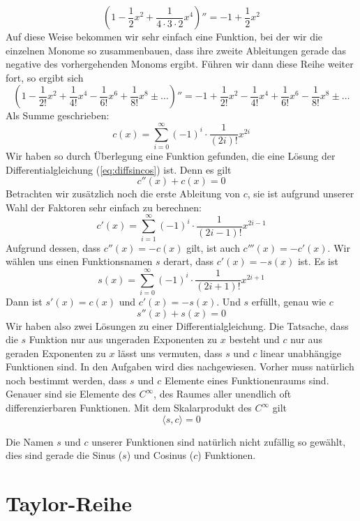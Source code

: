 \begin{equation}
\left(1 - \frac{1}{2}x^2 + \frac{1}{4\cdot 3\cdot 2} x^4 \right)'' = -1 +\frac{1}{2}x^2
\end{equation}
Auf diese Weise bekommen wir sehr einfach eine Funktion, bei der wir die einzelnen Monome so zusammenbauen, dass ihre zweite Ableitungen gerade das negative des vorhergehenden Monoms ergibt. Führen wir dann diese Reihe weiter fort, so ergibt sich
\begin{equation}
\left( 1-\frac{1}{2!}x^2 +\frac{1}{4!}x^4 -\frac{1}{6!}x^6+\frac{1}{8!}x^8 \pm \dots \right)'' =
-1+\frac{1}{2!}x^2 -\frac{1}{4!}x^4 +\frac{1}{6!}x^6 -\frac{1}{8!}x^8 \pm \dots
\end{equation}
Als Summe geschrieben:
\begin{equation}
c(x) = \sum_{i=0}^{\infty} (-1)^{i} \cdot \frac{1}{(2i)!} x^{2i}
\end{equation}
Wir haben so durch Überlegung eine Funktion gefunden, die eine Lösung der Differentialgleichung (\ref{eq:diffsincos}) ist. Denn es gilt
\begin{equation}
c''(x) +c(x) = 0
\end{equation}
Betrachten wir zusätzlich noch die erste Ableitung von $c$, sie ist aufgrund unserer Wahl der Faktoren sehr einfach zu berechnen:
\begin{equation}
c'(x) = \sum_{i=1}^{\infty} (-1)^{i}\cdot \frac{1}{(2i-1)!}x^{2i-1}
\end{equation}
Aufgrund dessen, dass $c''(x) = -c(x)$ gilt, ist auch $c'''(x) = -c'(x)$. Wir wählen uns einen Funktionsnamen $s$ derart, dass $c'(x) = -s(x)$ ist. Es ist
\begin{equation}
s(x) = \sum_{i=0}^{\infty} (-1)^i \cdot \frac{1}{(2i+1)!}x^{2i+1}
\end{equation}
Dann ist $s'(x) = c(x)$ und $c'(x) = -s(x)$. Und $s$ erfüllt, genau wie $c$
\begin{equation}
s''(x) +s(x) =0
\end{equation}
Wir haben also zwei Lösungen zu einer Differentialgleichung. Die Tatsache, dass die $s$ Funktion nur aus ungeraden Exponenten zu $x$ besteht und $c$ nur aus geraden Exponenten zu $x$ lässt uns vermuten, dass $s$ und $c$ linear unabhängige Funktionen sind. In den Aufgaben wird dies nachgewiesen. Vorher muss natürlich noch bestimmt werden, dass $s$ und $c$ Elemente eines Funktionenraums sind. Genauer sind sie Elemente des $C^{\infty}$, des Raumes aller unendlich oft differenzierbaren Funktionen. Mit dem Skalarprodukt des $C^\infty$ gilt
\begin{equation}
\langle s,c\rangle = 0
\end{equation}

Die Namen $s$ und $c$ unserer Funktionen sind natürlich nicht zufällig so gewählt, dies sind gerade die Sinus ($s$) und Cosinus ($c$) Funktionen. 

\section{Taylor-Reihe}

